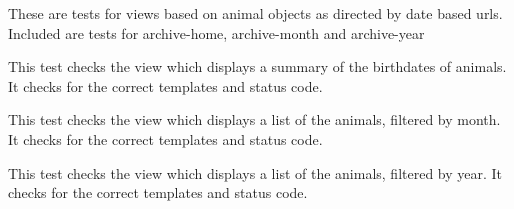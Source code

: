 \documentclass[letterpaper,10pt,english]{sphinxmanual}
\begin{document}
\begin{fulllineitems}
\label{animals:mousedb.animal.tests.DateViewTests}
These are tests for views based on animal objects as directed by date based urls.  Included are tests for archive-home, archive-month and archive-year

\begin{fulllineitems}
\label{animals:mousedb.animal.tests.DateViewTests.test_archive_home}
This test checks the view which displays a summary of the birthdates of animals.  It checks for the correct templates and status code.

\end{fulllineitems}


\begin{fulllineitems}
\label{animals:mousedb.animal.tests.DateViewTests.test_archive_month}
This test checks the view which displays a list of the animals, filtered by month.  It checks for the correct templates and status code.

\end{fulllineitems}


\begin{fulllineitems}
\label{animals:mousedb.animal.tests.DateViewTests.test_archive_year}
This test checks the view which displays a list of the animals, filtered by year.  It checks for the correct templates and status code.

\end{fulllineitems}


\end{fulllineitems}

\end{document}
